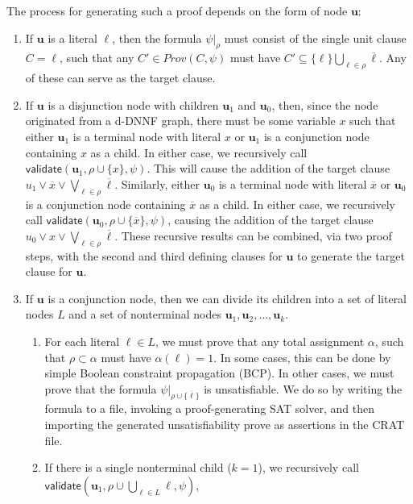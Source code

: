 \documentclass[letterpaper,USenglish,cleveref, autoref, thm-restate]{lipics-v2021}
\newcommand{\obar}[1]{\overline{#1}}
\newcommand{\lit}{\ell}
\newcommand{\passign}{\rho}
\newcommand{\validate}{\textsf{validate}}
\newcommand{\makenode}[1]{\mathbf{#1}}
\newcommand{\nodeu}{\makenode{u}}
\newcommand{\simplify}[2]{#1|_{#2}}
\newcommand{\prov}{\mathit{Prov}}
\begin{document}
The process for generating such a proof depends on the form of node $\nodeu$:
\begin{enumerate}
\item If $\nodeu$ is a literal $\lit$, then the formula
  $\simplify{\psi}{\passign}$ must consist of the single unit clause
  $C = \lit$, such that any $C' \in \prov(C, \psi)$ must have $C' \subseteq \{ \lit \} \bigcup_{\lit \in \passign} \obar{\lit}$.
  Any of these can
  serve as the target clause.
\item If $\nodeu$ is a disjunction node with children $\nodeu_1$ and $\nodeu_0$,
  then, since the node originated from a d-DNNF graph, there must be
  some variable $x$ such that either $\nodeu_1$ is a terminal node with literal $x$ or $\nodeu_1$ is a
  conjunction node containing $x$ as a child.  In either case, we
  recursively call $\validate(\nodeu_1, \passign \cup \{ x \}, \psi)$.
  This will cause the addition of the target clause
  $u_1 \lor \obar{x} \lor \bigvee_{\lit \in \passign} \obar{\lit}$.
Similarly, either $\nodeu_0$ is a terminal node with literal $\obar{x}$ or $\nodeu_0$ is a conjunction node containing $\obar{x}$ as
  a child.  In either case, we recursively call $\validate(\nodeu_0, \passign \cup \{ \obar{x} \}, \psi)$,
  causing the addition of the target clause
  $u_0 \lor x \lor \bigvee_{\lit \in \passign} \obar{\lit}$.
  These recursive results can be combined, via two proof steps, with the second and third defining clauses for $\nodeu$
  to generate the target clause for $\nodeu$.
\item If $\nodeu$ is a conjunction node, then we can divide its children
  into a set of literal nodes $L$ and a set of nonterminal nodes $\nodeu_1, \nodeu_2, \ldots, \nodeu_k$.
  \begin{enumerate}
    \item For each literal 
  $\lit \in L$, we must prove that any total assignment $\alpha$, such that
  $\passign \subset \alpha$ must have $\alpha(\lit) = 1$.  In some
  cases, this can be done by simple Boolean constraint propagation (BCP).
  In other cases, we must prove that the formula
  $\simplify{\psi}{\passign \cup \{\obar{\lit}\}}$ is unsatisfiable.  We
  do so by writing the formula to a file, invoking a proof-generating
  SAT solver, and then importing the generated unsatisfiability prove
  as assertions in the CRAT file.
\item If there is a single nonterminal child ($k = 1$), we recursively call
  $\validate \left(\nodeu_1, \passign \cup \bigcup_{\lit \in L} \lit, \psi\right)$, 

\end{enumerate}
\end{enumerate}
\end{document}
